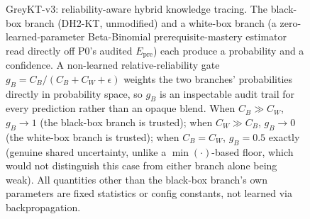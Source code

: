 \begin{figure}[!t]
{\begin{tikzpicture}
\end{tikzpicture}%
}
\caption{GreyKT-v3: reliability-aware hybrid knowledge tracing. The black-box
branch (DH2-KT, unmodified) and a white-box branch (a zero-learned-parameter
Beta-Binomial prerequisite-mastery estimator read directly off P0's audited
$E_{\mathrm{pre}}$) each produce a probability and a confidence. A non-learned
relative-reliability gate $g_B=C_B/(C_B+C_W+\epsilon)$ weights the two
branches' probabilities directly in probability space, so $g_B$ is an
inspectable audit trail for every prediction rather than an opaque blend.
When $C_B\gg C_W$, $g_B\to1$ (the black-box branch is trusted); when
$C_W\gg C_B$, $g_B\to0$ (the white-box branch is trusted); when $C_B=C_W$,
$g_B=0.5$ exactly (genuine shared uncertainty, unlike a $\min(\cdot)$-based
floor, which would not distinguish this case from either branch alone being
weak). All quantities other than the black-box branch's own parameters are
fixed statistics or config constants, not learned via backpropagation.}
\label{fig:greykt_v3_architecture}
\end{figure}
